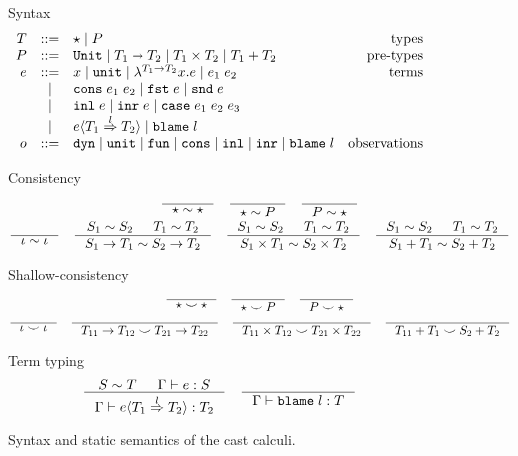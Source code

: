 \documentclass[acmsmall,review,anonymous]{acmart}\settopmatter{printfolios=true,printccs=false,printacmref=false}
\newcommand{\stxrule}[3]{#1 & ::= & #3 & \text{#2}\\}
\newcommand{\stxrulecont}[1]{& | & #1 & \\}
\newcommand{\plus}[0]{+}
\newcommand{\judgetype}[3]{#1 \vdash #2 : #3}
\newcommand{\POOunit}[0]{\mathtt{Unit}}
\newcommand{\POOfun}[2]{#1 \shortrightarrow #2}
\newcommand{\POOprod}[2]{#1 \times #2}
\newcommand{\POOsum}[2]{#1 \plus #2}
\newcommand{\eOOvar}[1]{#1}
\newcommand{\eOOsole}[0]{\mathtt{unit}}
\newcommand{\eOOlam}[4]{\lambda^{#1\rightarrow{}#2}#3.#4}
\newcommand{\eOOapp}[2]{#1 \; #2}
\newcommand{\eOOcons}[2]{\mathtt{cons} \; #1 \; #2}
\newcommand{\eOOcar}[1]{\mathtt{fst} \; #1}
\newcommand{\eOOcdr}[1]{\mathtt{snd} \; #1}
\newcommand{\eOOinl}[1]{\mathtt{inl} \; #1}
\newcommand{\eOOinr}[1]{\mathtt{inr} \; #1}
\newcommand{\eOOcase}[3]{\mathtt{case} \; #1 \; #2 \; #3}
\newcommand{\eOOcast}[4]{#1 \langle \cOOcast{#2}{#3}{#4} \rangle}
\newcommand{\eOOblame}[1]{\mathtt{blame} \; #1}
\newcommand{\oOOinj}{\mathtt{dyn}}
\newcommand{\oOOsole}{\mathtt{unit}}
\newcommand{\oOOfun}{\mathtt{fun}}
\newcommand{\oOOcons}{\mathtt{cons}}
\newcommand{\oOOinl}{\mathtt{inl}}
\newcommand{\oOOinr}{\mathtt{inr}}
\newcommand{\oOOblame}[1]{\mathtt{blame} \; #1}
\newcommand{\cOOcast}[3]{#1 \overset{#2}{\Rightarrow} #3}
\begin{document}
\begin{figure}
	Syntax
	\[
	\begin{array}{rclr}
	\stxrule{T}{types}{
		\star \mid{}
		P
	}
	\stxrule{P}{pre-types}{
		\POOunit \mid
		\POOfun{T_1}{T_2} \mid
		\POOprod{T_1}{T_2} \mid
		\POOsum{T_1}{T_2}
	}
	\stxrule{e}{terms}{
		\eOOvar{x} \mid{}
		\eOOsole{} \mid{}
		\eOOlam{T_1}{T_2}{x}{e} \mid
		\eOOapp{e_1}{e_2}
	}
	\stxrulecont{
		\eOOcons{e_1}{e_2} \mid
		\eOOcar{e} \mid
		\eOOcdr{e}
	}
	\stxrulecont{
		\eOOinl{e} \mid
		\eOOinr{e} \mid
		\eOOcase{e_1}{e_2}{e_3}
	}
	\stxrulecont{
		\eOOcast{e}{T_1}{l}{T_2} \mid
		\eOOblame{l}
	}
	\stxrule{o}{observations}{
		\oOOinj \mid
		\oOOsole \mid
		\oOOfun \mid
		\oOOcons \mid
		\oOOinl \mid
		\oOOinr \mid
		\oOOblame{l}
	}
	\end{array}
	\]
	
	Consistency
	\begin{gather*}
	\inference{}{
		\star \sim \star
	} \quad
	\inference{}{
		\star \sim P
	} \quad
	\inference{}{
		P \sim \star
	} \\
	\inference{}{
		\iota \sim \iota
	} \quad
	\inference{
		S_1 \sim S_2 &
		T_1 \sim T_2
	}{
		S_1 \rightarrow T_1 \sim S_2 \rightarrow T_2
	} \quad
	\inference{
		S_1 \sim S_2 &
		T_1 \sim T_2
	}{
		S_1 \times T_1 \sim S_2 \times T_2
	} \quad
	\inference{
		S_1 \sim S_2 &
		T_1 \sim T_2
	}{
		S_1 \plus T_1 \sim S_2 \plus T_2
	}
	\end{gather*}
	
	Shallow-consistency
	\begin{gather*}
	\inference{}{
		\star \smile \star
	} \quad
	\inference{}{
		\star \smile P
	} \quad
	\inference{}{
		P \smile \star
	} \\
	\inference{}{
		\iota \smile \iota
	} \quad
	\inference{}{
		T_{11} \rightarrow T_{12} \smile T_{21} \rightarrow T_{22}
	} \quad
	\inference{}{
		T_{11} \times T_{12} \smile T_{21} \times T_{22}
	} \quad
	\inference{}{
	T_{11} \plus T_1 \smile S_2 \plus T_2
	}
	\end{gather*}
	
	Term typing
	\fbox{$ \judgetype{\Gamma}{e}{T} $}
	\begin{gather*}
		\inference{
			S \sim T & \Gamma \vdash e : S 
		}{
			\judgetype{\Gamma}{\eOOcast{e}{T_1}{l}{T_2}}{T_2}
		} \quad
		\inference{
		}{
			\judgetype{\Gamma}{\eOOblame{l}}{T}
		}
	\end{gather*}
	
	\caption{Syntax and static semantics of the cast calculi.}
	\label{fig:blame-static}
\end{figure}
\end{document}
